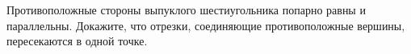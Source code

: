 \begin{ex}
	\begin{condition}
		Противоположные стороны выпуклого шестиугольника попарно равны и параллельны. Докажите, что отрезки, соединяющие противоположные вершины, пересекаются в одной точке. 
	\end{condition}
\end{ex}